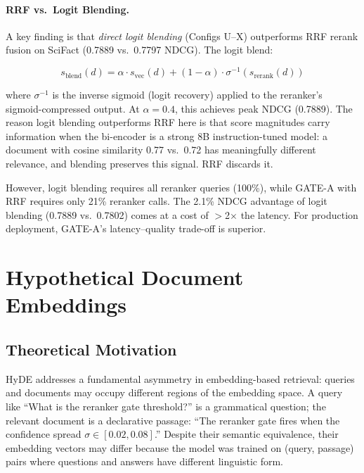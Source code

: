 \documentclass[11pt]{article}
\begin{document}
\paragraph{RRF vs.\ Logit Blending.}
A key finding is that \emph{direct logit blending} (Configs U--X) outperforms RRF
rerank fusion on SciFact (0.7889 vs.\ 0.7797 NDCG). The logit blend:

\begin{equation}
  s_{\text{blend}}(d) = \alpha \cdot s_{\text{vec}}(d) + (1-\alpha) \cdot \sigma^{-1}(s_{\text{rerank}}(d))
\end{equation}

where $\sigma^{-1}$ is the inverse sigmoid (logit recovery) applied to the reranker's
sigmoid-compressed output. At $\alpha=0.4$, this achieves peak NDCG (0.7889). The
reason logit blending outperforms RRF here is that score magnitudes carry information
when the bi-encoder is a strong 8B instruction-tuned model: a document with cosine
similarity 0.77 vs.\ 0.72 has meaningfully different relevance, and blending preserves
this signal. RRF discards it.

However, logit blending requires all reranker queries (100\%), while GATE-A with RRF
requires only 21\% reranker calls. The 2.1\% NDCG advantage of logit blending
(0.7889 vs.\ 0.7802) comes at a cost of $>$2$\times$ the latency. For production
deployment, GATE-A's latency--quality trade-off is superior.

\section{Hypothetical Document Embeddings}
\label{sec:hyde}

\subsection{Theoretical Motivation}

HyDE addresses a fundamental asymmetry in embedding-based retrieval: queries and
documents may occupy different regions of the embedding space. A query like
``What is the reranker gate threshold?'' is a grammatical question; the relevant
document is a declarative passage: ``The reranker gate fires when the confidence spread
$\sigma \in [0.02, 0.08]$.'' Despite their semantic equivalence, their embedding
vectors may differ because the model was trained on (query, passage) pairs where
questions and answers have different linguistic form.
\end{document}
